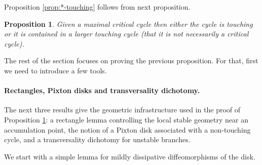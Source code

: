 \documentclass[a4paper,11pt]{article}
\newtheorem{proposition}[lemma]{Proposition}
\newtheorem{remark}[lemma]{Remark}
\theoremstyle{definition}
\def\La{\Lambda}
\def\La{\Lambda}
\def\emp{\emptyset}
\begin{document}
Proposition \ref{prop:*-touching} follows from next  proposition. 



\begin{proposition}\label{existence of touching} Given a maximal critical cycle then either the cycle is touching or it is contained in a larger touching cycle (that it is not necessarily a critical cycle).


\end{proposition}

The rest of the section focuses on proving the previous proposition.  For that, first we need to introduce a few tools. 

\paragraph{Rectangles, Pixton disks and transversality  dichotomy.} 
The next three results give the geometric infrastructure used in the proof of Proposition \ref{existence of touching}: a rectangle lemma controlling the local stable geometry near an accumulation point, the notion of a Pixton disk associated with a non-touching cycle, and a transversality dichotomy for unstable branches.

We start with a simple lemma for mildly dissipative diffeomorphisms of the disk.





    


\end{document}
